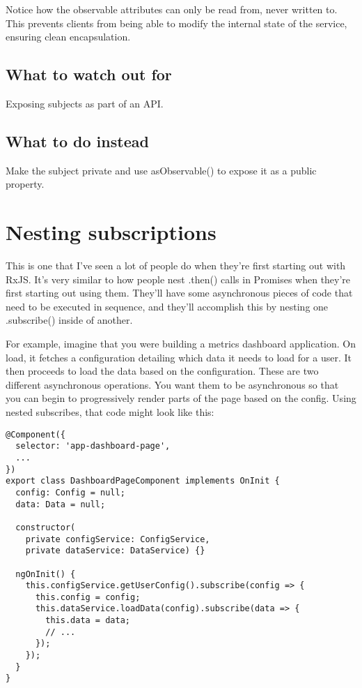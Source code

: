 Notice how the observable attributes can only be read from, never written to. This prevents clients from being able to modify the internal state of the service, ensuring clean encapsulation.

\subsection{What to watch out for}
Exposing subjects as part of an API.

\subsection{What to do instead}
Make the subject private and use asObservable() to expose it as a public property.

\section{Nesting subscriptions}
This is one that I’ve seen a lot of people do when they’re first starting out with RxJS. It’s very similar to how people nest .then() calls in Promises when they’re first starting out using them. They’ll have some asynchronous pieces of code that need to be executed in sequence, and they’ll accomplish this by nesting one .subscribe() inside of another.

For example, imagine that you were building a metrics dashboard application. On load, it fetches a configuration detailing which data it needs to load for a user. It then proceeds to load the data based on the configuration. These are two different asynchronous operations. You want them to be asynchronous so that you can begin to progressively render parts of the page based on the config. Using nested subscribes, that code might look like this:

\begin{lstlisting}
@Component({
  selector: 'app-dashboard-page',
  ...
})
export class DashboardPageComponent implements OnInit {
  config: Config = null;
  data: Data = null;

  constructor(
    private configService: ConfigService, 
    private dataService: DataService) {}

  ngOnInit() {
    this.configService.getUserConfig().subscribe(config => {
      this.config = config;
      this.dataService.loadData(config).subscribe(data => {
        this.data = data;
        // ...
      });
    });
  }
}  
\end{lstlisting}

